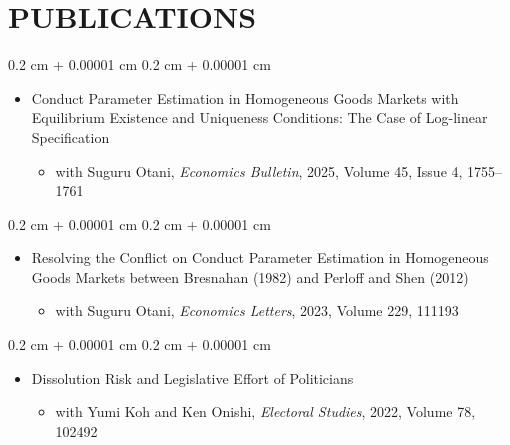 \documentclass[10pt, letterpaper]{article}
\newenvironment{highlights}{
    \begin{itemize}[
        topsep=0.10 cm,
        parsep=0.10 cm,
        partopsep=0pt,
        itemsep=0.0 cm,
        leftmargin=0.4 cm + 10pt
    ]
}{
    \end{itemize}
} %
\newenvironment{onecolentry}{
    \begin{adjustwidth}{
        0.2 cm + 0.00001 cm
    }{
        0.2 cm + 0.00001 cm
    }
}{
    \end{adjustwidth}
} %
\begin{document}
    \section{PUBLICATIONS}
    \begin{samepage}
        \begin{onecolentry}
            \begin{highlights}
                \item Conduct Parameter Estimation in Homogeneous Goods Markets with Equilibrium Existence and Uniqueness Conditions: The Case of Log-linear Specification
                \begin{highlights}
                    \item with Suguru Otani, \textit{Economics Bulletin}, 2025, Volume 45, Issue 4, 1755--1761
                \end{highlights}
            \end{highlights}
        \end{onecolentry}
    \end{samepage}
    \vspace{0.10 cm}
    \begin{samepage}
        \begin{onecolentry}
            \begin{highlights}
                \item Resolving the Conflict on Conduct Parameter Estimation in Homogeneous Goods Markets between Bresnahan (1982) and Perloff and Shen (2012)
                \begin{highlights}
                    \item with Suguru Otani, \textit{Economics Letters}, 2023, Volume 229, 111193
                \end{highlights}
            \end{highlights}
        \end{onecolentry}
    \end{samepage}
    \vspace{0.10 cm}
    \begin{samepage}
        \begin{onecolentry}
            \begin{highlights}
                \item Dissolution Risk and Legislative Effort of Politicians
                \begin{highlights}
                    \item with Yumi Koh and Ken Onishi, \textit{Electoral Studies}, 2022, Volume 78, 102492
                \end{highlights}
            \end{highlights}
        \end{onecolentry}
    \end{samepage}
\end{document}
